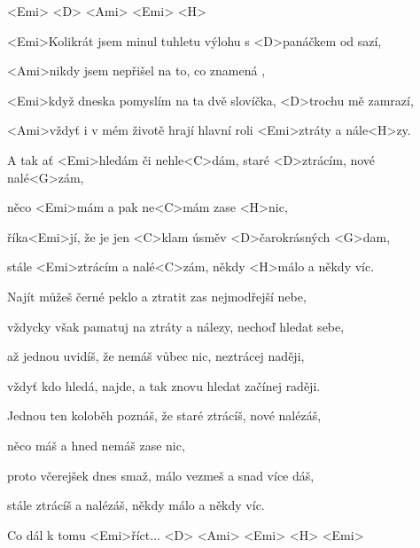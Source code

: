 

<Emi> <D> <Ami> <Emi> <H>

\zs
<Emi>Kolikrát jsem minul tuhletu výlohu s <D>panáčkem od sazí,

<Ami>nikdy jsem nepřišel na to, co znamená ,

<Emi>když dneska pomyslím na ta dvě slovíčka, <D>trochu mě zamrazí,

<Ami>vždyť i v mém životě hrají hlavní roli <Emi>ztráty a nále<H>zy.
\ks

\zr
A tak ať <Emi>hledám či nehle<C>dám, staré <D>ztrácím, nové nalé<G>zám,

něco <Emi>mám a pak ne<C>mám zase <H>nic,

říka<Emi>jí, že je jen <C>klam úsměv <D>čarokrásných <G>dam,

stále <Emi>ztrácím a nalé<C>zám, někdy <H>málo a někdy víc.
\kr

\zs
Najít můžeš černé peklo a ztratit zas nejmodřejší nebe,

vždycky však pamatuj na ztráty a nálezy, nechoď hledat sebe,

až jednou uvidíš, že nemáš vůbec nic, neztrácej naději,

vždyť kdo hledá, najde, a tak znovu hledat začínej raději.
\ks

\zr
Jednou ten koloběh poznáš, že staré ztrácíš, nové nalézáš,

něco máš a hned nemáš zase nic,

proto včerejšek dnes smaž, málo vezmeš a snad více dáš,

stále ztrácíš a nalézáš, někdy málo a někdy víc.
\kr

Co dál k tomu <Emi>říct... <D> <Ami> <Emi> <H> <Emi>

\kp

























